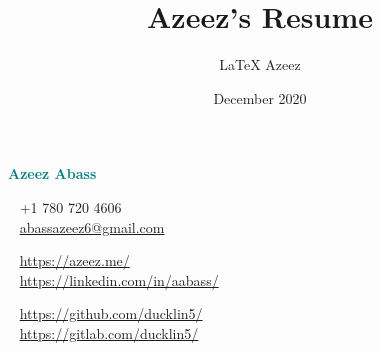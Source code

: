 \documentclass[a4paper]{modernsimplecv}
\title{Azeez's Resume}
\author{\LaTeX{} Azeez}
\date{December 2020}
\begin{document}
\thispagestyle{empty}


    \vspace{-2em}
    \begin{minipage}[t]{1.0\textwidth}
        \begin{shaded*}
            \Huge
            \begin{minipage}[t]{\textwidth}
                \bfseries\FocusFont\textcolor{teal}{Azeez Abass}
                \raisebox{.3ex}{\Large$\cdot$ Software Engineer $\cdot$ Video Game and Web Developer}
            \end{minipage}
            \vspace{10pt}
            \footnotesize
            \begin{minipage}[t]{0.33\textwidth}
                \vspace{0pt} %
                \faPhone~ +1 780 720 4606 \\
                \faAt~ \url{abassazeez6@gmail.com} \\
            \end{minipage}
            \begin{minipage}[t]{0.33\textwidth}
                \vspace{0pt} %
                \faGlobe~ \url{https://azeez.me/} \\
                \faLinkedin~ \url{https://linkedin.com/in/aabass/} \\
            \end{minipage}
            \begin{minipage}[t]{0.33\textwidth}
                \vspace{0pt} %
                \faGithub~ \url{https://github.com/ducklin5/} \\
                \faGitlab~ \url{https://gitlab.com/ducklin5/} \\
            \end{minipage}
            \vspace{-2em}
        \end{shaded*}
    \end{minipage}\\

    \newlength{\rightcolwidth}
    \newlength{\leftcolwidth}
    \setlength{\leftcolwidth}{0.485\textwidth}
    \setlength{\rightcolwidth}{0.485\textwidth}
\end{document}
